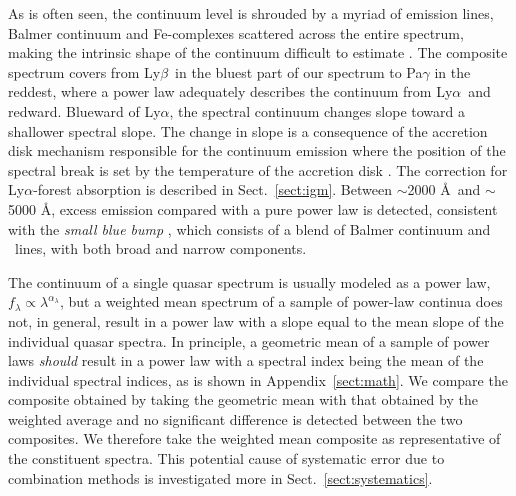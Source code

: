 \documentclass{aa}    %
\newcommand{\figlabel}[1]{\label{fig:#1}}
\newcommand{\sectionname}{Sect.}
\newcommand{\Sect}[1]{\sectionname~\ref{sect:#1}}
\newcommand{\sect}[1]{\Sect{#1}}
\newcommand{\App}[1]{Appendix~\ref{sect:#1}}
\newcommand{\lya}{Ly$\alpha$}
\newcommand{\lyb}{Ly$\beta$}
\newcommand{\feii}{\ion{Fe}{ii}}
\begin{document}


As is often seen, the continuum level is shrouded by a myriad of emission lines,
Balmer continuum and Fe-complexes scattered across the entire spectrum, making
the intrinsic shape of the continuum difficult to estimate \citep{Elvis2001}. 
The composite spectrum covers from \lyb ~in the bluest part of our spectrum to
Pa$\gamma$ in the reddest, where a power law adequately describes the
continuum from \lya~and redward. Blueward of \lya, the spectral
continuum changes slope toward a shallower spectral slope. The change in slope
is a consequence of the accretion disk mechanism responsible for the continuum
emission where the position of the spectral break is set by the temperature of the
accretion disk \citep{Pereyra2006}. The correction for \lya-forest absorption is
described in \sect{igm}.
Between $\sim$2000 \AA~and $\sim$5000 \AA, excess emission compared with a
pure power law is detected, consistent with the \textit{small blue bump}
\citep{Wills1985}, which consists of a blend of Balmer continuum and \feii
~lines, with both broad and narrow components.

 The continuum of a single quasar spectrum is usually modeled as a power law, $f_{\lambda}
\propto \lambda^{\alpha_{\lambda}}$, but a weighted mean spectrum of a sample of power-law continua
does not, in general, result in a power law with a slope equal to the mean slope of
the individual quasar spectra. In principle, a geometric mean of a sample of power laws
\textit{should} result in a power law with a spectral index being the mean of the individual spectral indices, as is shown in
\App{math}. We compare the composite obtained by taking the geometric mean with
that obtained by the weighted average and no significant difference is detected
between the two composites. We therefore take the weighted mean composite as
representative of the constituent spectra. This potential cause of systematic
error due to combination methods is investigated more in \sect{systematics}.
\end{document}
